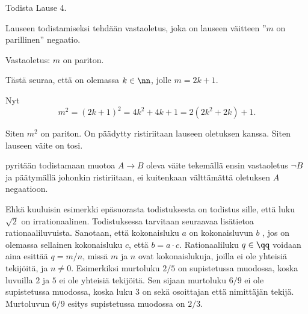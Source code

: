 
\begin{esimerkki}
	Todista Lause 4.

	\begin{todistus}
		Lauseen todistamiseksi tehdään vastaoletus, joka on lauseen väitteen ''$m$ on parillinen'' negaatio.

		Vastaoletus: $m$ on pariton.

		Tästä seuraa, että on olemassa $k\in \nn$, jolle $m=2k+1$.

		Nyt
		\[
			m^2 = (2k+1)^2 = 4k^2+4k+1 = 2(2k^2+2k)+1.
		\]

		Siten $m^2$ on pariton. On päädytty ristiriitaan lauseen oletuksen kanssa. Siten lauseen väite on tosi.
	\end{todistus}
\end{esimerkki}

 pyritään todistamaan muotoa $A\to B$ oleva
väite tekemällä ensin vastaoletus $\lnot B$ ja päätymällä johonkin ristiriitaan, ei kuitenkaan
välttämättä oletuksen $A$ negaatioon.

Ehkä kuuluisin esimerkki epäsuorasta todistuksesta on todistus sille, että luku $\sqrt{2}$ on irrationaalinen. 
Todistuksessa tarvitaan seuraavaa lisätietoa rationaaliluvuista. Sanotaan, että kokonaisluku $a$ on kokonaisluvun $b$ 
, jos on olemassa sellainen kokonaisluku $c$, että $b=a\cdot c$. Rationaaliluku $q\in\qq$ voidaan 
aina esittää  $q=m/n$, missä $m$ ja $n$ ovat kokonaislukuja, joilla ei 
ole yhteisiä tekijöitä, ja $n\neq 0$. Esimerkiksi murtoluku $2/5$ on supistetussa muodossa, koska luvuilla $2$ ja $5$ 
ei ole yhteisiä tekijöitä. Sen sijaan murtoluku $6/9$ ei ole supistetussa muodossa, koska luku $3$ on sekä osoittajan 
että nimittäjän tekijä. Murtoluvun $6/9$ esitys supistetussa muodossa on $2/3$.


